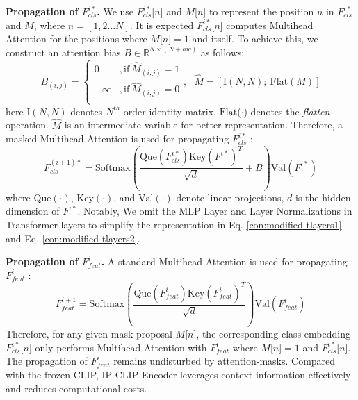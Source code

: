 \noindent \textbf{Propagation of $F^{i*}_{cls}$.}
We use $F^{i*}_{cls}$[$n$] and $M$[$n$] to represent the position $n$ in $F^{i*}_{cls}$ and $M$, where $n=[1,2...N]$. It is expected $F^{i*}_{cls}$[$n$] computes Multihead Attention for the positions where $M$[$n$]$=1$ and itself. To achieve this, we construct an attention bias $B \in \mathbb{R}^{N \times (N+hw)}$ as follows:
\begin{equation}
B_{(i,j)}=\left\{
\begin{aligned}
0  &, \mathrm{if} ~ {\hat{M}}_{(i,j)} = 1\\
-\infty  &, \mathrm{if} ~ {\hat{M}}_{(i,j)} = 0\\
\end{aligned}
\right.
,~~~ \hat{M} = [\mathrm{I}(N,N);~ \mathrm{Flat}(M)]
\end{equation}
here $\mathrm{I}(N,N)$ denotes $N^{th}$ order identity matrix, $\mathrm{Flat}$($\cdot$) denotes the \textit{flatten} operation. $\hat{M}$ is an intermediate variable for better representation. Therefore, a masked Multihead Attention is used for propagating $F^{i*}_{cls}$ 
:
\begin{equation}
   F^{(i+1)*}_{cls} =\mathrm{Softmax}(\frac{\mathrm{Que}(F^{i*}_{cls})\mathrm{Key}(F^{i*})^T}{\sqrt{d}} + B)\mathrm{Val}(F^{i*})
   \label{con:modified tlayers1}
\end{equation}
where $\mathrm{Que}(\cdot)$, $\mathrm{Key}(\cdot)$, and $\mathrm{Val}(\cdot)$ denote linear projections, $d$ is the hidden dimension of $F^{i*}$. Notably, We omit the MLP Layer and Layer Normalizations in Transformer layers to simplify the representation in Eq. \ref{con:modified tlayers1} and Eq. \ref{con:modified tlayers2}.

\noindent \textbf{Propagation of $F^{i}_{feat}$.}
A standard Multihead Attention is used for propagating $F^{i}_{feat}$ 
: 
\begin{equation}
   F^{i+1}_{feat} =\mathrm{Softmax}(\frac{\mathrm{Que}(F^{i}_{feat})\mathrm{Key}(F^{i}_{feat})^T}{\sqrt{d}})\mathrm{Val}(F^{i}_{feat})
   \label{con:modified tlayers2}
\end{equation}
Therefore, for any given mask proposal $M$[$n$], the corresponding class-embedding $F^{i*}_{cls}$[$n$] only performs Multihead Attention with $F^{i}_{feat}$ where $M$[$n$]$=1$ and $F^{i*}_{cls}$[$n$]. The propagation of $F^{i}_{feat}$ remains undisturbed by attention-masks. Compared with the frozen CLIP,  IP-CLIP Encoder leverages context information effectively and reduces computational costs.



